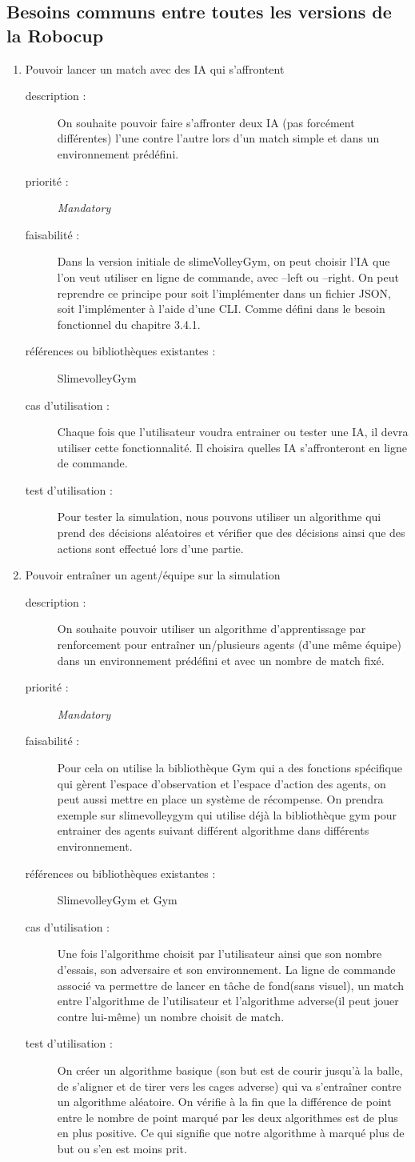 \documentclass[11pt, a4paper]{article}
\newcommand{\besoinItem}[7]{
    \item #1
    \begin{description}
        \item[description :]
        #2 
        \item[priorité :]
        #3
        \item[faisabilité :]
        #4
        \item[références ou bibliothèques existantes :]
        #5
        \item[cas d'utilisation :]
        #6
        \item[test d'utilisation :]      
        #7 
    \end{description}
}
\begin{document}
\subsection{Besoins communs entre toutes les versions de la Robocup}
\begin{enumerate}
  \besoinItem{Pouvoir lancer un match avec des IA qui s'affrontent }{On souhaite pouvoir faire s'affronter deux IA (pas forcément différentes) l'une contre l'autre lors d'un match simple et dans un environnement prédéfini.}
  {\textit{Mandatory}}
  {Dans la version initiale de slimeVolleyGym, on peut choisir l'IA que l'on veut utiliser en ligne de commande, avec --left ou --right. On peut reprendre ce principe pour soit l'implémenter dans un fichier JSON, soit l'implémenter à l'aide d'une CLI. Comme défini dans le besoin fonctionnel du chapitre 3.4.1.}
  {SlimevolleyGym }
  {Chaque fois que l'utilisateur voudra entrainer ou tester une IA, il devra utiliser cette fonctionnalité. Il choisira quelles IA s'affronteront en ligne de commande.}
  {Pour tester la simulation, nous pouvons utiliser un algorithme qui prend des décisions aléatoires et vérifier que des décisions ainsi que des actions sont effectué lors d'une partie.}	
  
  \besoinItem{Pouvoir entraîner un agent/équipe sur la simulation}
  {On souhaite pouvoir utiliser un algorithme d'apprentissage par renforcement pour entraîner un/plusieurs agents (d'une même équipe) dans un environnement prédéfini et avec un nombre de match fixé. }
  {\textit{Mandatory}}
  {Pour cela on utilise la bibliothèque Gym qui a des fonctions spécifique qui gèrent l'espace d'observation et l'espace d'action des agents, on peut aussi mettre en place un système de récompense. On prendra exemple sur slimevolleygym qui utilise déjà la bibliothèque gym pour entrainer des agents suivant différent algorithme dans différents environnement.}
  {SlimevolleyGym et Gym}
  {Une fois l'algorithme choisit par l'utilisateur ainsi que son nombre d'essais, son adversaire et son environnement. La ligne de commande associé va permettre de lancer en tâche de fond(sans visuel), un match entre l'algorithme de l'utilisateur et l'algorithme adverse(il peut jouer contre lui-même) un nombre choisit de match.}
  {On créer un algorithme basique (son but est de courir jusqu'à la balle, de s'aligner et de tirer vers les cages adverse) qui va s'entraîner contre un algorithme aléatoire. On vérifie à la fin que la différence de point entre le nombre de point marqué par les deux algorithmes est de plus en plus positive. Ce qui signifie que notre algorithme à marqué plus de but ou s'en est moins prit.}
  

\end{enumerate}
\end{document}
